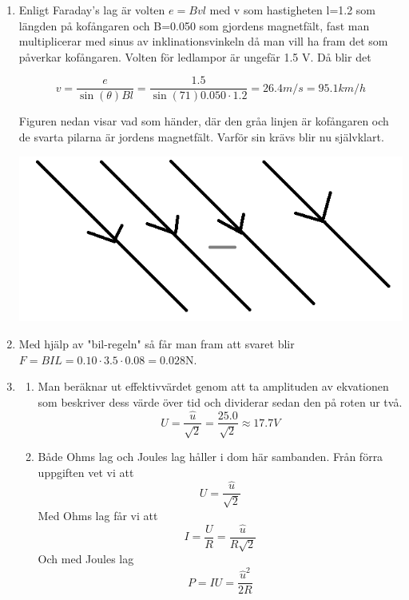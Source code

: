 \documentclass[a4paper,12pt]{article}
\begin{document}
\begin{enumerate}
      \item Enligt Faraday's lag är volten $e=Bvl$ med v som hastigheten
            l=1.2 som längden på kofångaren och B=0.050 som gjordens magnetfält,
            fast man multiplicerar med sinus av inklinationsvinkeln då
            man vill ha fram det som påverkar kofångaren.
            Volten för ledlampor är ungefär 1.5 V. Då blir det

            $$v=\frac{e}{\sin(\theta)Bl}=\frac{1.5}{\sin(71)0.050\cdot 1.2}=26.4m/s=95.1km/h$$

            Figuren nedan visar vad som händer, där den gråa linjen är kofångaren
            och de svarta pilarna är jordens magnetfält. Varför sin krävs blir nu självklart.
            \begin{center}
                  \includegraphics[scale=0.3]{figur1.png}
            \end{center}

      \item Med hjälp av "bil-regeln" så får man fram att
            svaret blir $F=BIL=0.10\cdot 3.5\cdot 0.08=0.028$N.

      \item
            \begin{enumerate}
                  \item Man beräknar ut effektivvärdet genom att
                        ta amplituden av ekvationen som beskriver dess värde över
                        tid och dividerar sedan den på roten ur två.
                        $$U=\frac{\hat{u}}{\sqrt{2}}=\frac{25.0}{\sqrt{2}}\approx 17.7V$$

                  \item Både Ohms lag och Joules lag håller i dom här sambanden.
                        Från förra uppgiften vet vi att $$U=\frac{\hat{u}}{\sqrt{2}}$$
                        Med Ohms lag får vi att $$I=\frac{U}{R}=\frac{\hat{u}}{R\sqrt{2}}$$
                        Och med Joules lag $$P=IU=\frac{\hat{u}^2}{2R}$$


\end{enumerate}
\end{enumerate}
\end{document}
